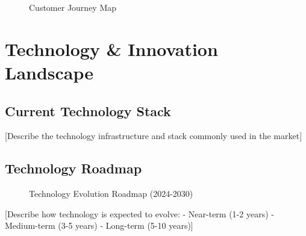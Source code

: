 \documentclass[11pt,letterpaper]{report}
\begin{document}

\begin{figure}[htbp]
\centering
\caption{Customer Journey Map}
\label{fig:customer_journey}
\end{figure}

\chapter{Technology \& Innovation Landscape}

\section{Current Technology Stack}

[Describe the technology infrastructure and stack commonly used in the market]

\section{Technology Roadmap}


\begin{figure}[htbp]
\centering
\caption{Technology Evolution Roadmap (2024-2030)}
\label{fig:tech_roadmap}
\end{figure}

[Describe how technology is expected to evolve:
- Near-term (1-2 years)
- Medium-term (3-5 years)
- Long-term (5-10 years)]
\end{document}
